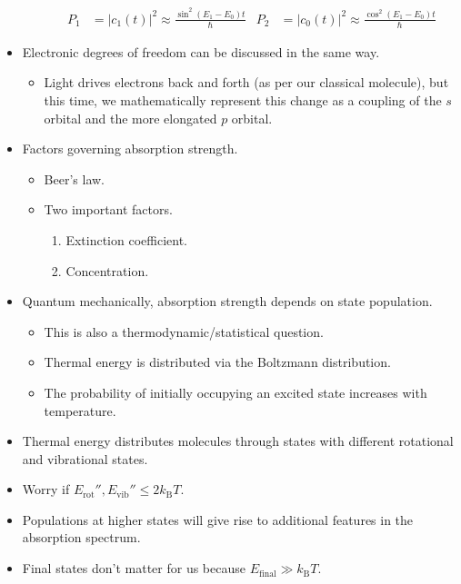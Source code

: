 \documentclass[../notes.tex]{subfiles}
\begin{document}
\begin{itemize}
\begin{itemize}
        \begin{align*}
            P_1 &= |c_1(t)|^2 \approx \frac{\sin^2(E_1-E_0)t}{\hbar}&
            P_2 &= |c_0(t)|^2 \approx \frac{\cos^2(E_1-E_0)t}{\hbar}
        \end{align*}
    \end{itemize}
    \item Electronic degrees of freedom can be discussed in the same way.
    \begin{itemize}
        \item Light drives electrons back and forth (as per our classical molecule), but this time, we mathematically represent this change as a coupling of the $s$ orbital and the more elongated $p$ orbital.
    \end{itemize}
    \item Factors governing absorption strength.
    \begin{itemize}
        \item Beer's law.
        \item Two important factors.
        \begin{enumerate}
            \item Extinction coefficient.
            \item Concentration.
        \end{enumerate}
    \end{itemize}
    \item Quantum mechanically, absorption strength depends on state population.
    \begin{itemize}
        \item This is also a thermodynamic/statistical question.
        \item Thermal energy is distributed via the Boltzmann distribution.
        \item The probability of initially occupying an excited state increases with temperature.
    \end{itemize}
    \item Thermal energy distributes molecules through states with different rotational and vibrational states.
    \item Worry if $E_\text{rot}'',E_\text{vib}''\leq 2k_\text{B}T$.
    \item Populations at higher states will give rise to additional features in the absorption spectrum.
    \item Final states don't matter for us because $E_\text{final}\gg k_\text{B}T$.
    \begin{itemize}

\end{itemize}
\end{itemize}
\end{document}
